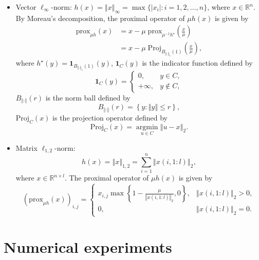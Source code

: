 \documentclass[a4paper]{article}
\newcommand{\norm}[1]{\left\Vert#1\right\Vert}
\newcommand{\mr}{\mathbb{R}}
\newcommand{\prox}{\mathrm{prox}}
\newcommand{\proj}{\mathrm{Proj}}
\newcommand{\mi}{\mathbf{1}}
\begin{document}
\begin{itemize}
  
  \item {Vector $\ell_\infty$-norm:} $h(x) = \norm{x}_\infty = 
  \max\{ |x_i|: i = 1, 2, \ldots, n \}$, where $x \in 
  \mr^n$. By Moreau's decomposition, the proximal operator of $\mu 
  h(x)$ is given by
  \begin{displaymath}
    \begin{split}
      \prox_{\mu h}(x) & = x - \mu \; \prox_{\mu^{-1} h^\star} \left( 
      \frac{x}{\mu} \right) \\
      & = x - \mu \; \proj_{B_{\norm{\cdot}_1}(1)} \left( 
      \frac{x}{\mu} \right),
    \end{split}
  \end{displaymath}
  where $h^\star(y) = \mi_{B_{\norm{\cdot}_1}(1)}(y)$, $\mi_C(y)$ is 
  the indicator function defined by
  \begin{displaymath}
    \mi_C(y) = 
    \begin{cases}
      0, & y \in C, \\
      +\infty, & y \notin C,
    \end{cases}
  \end{displaymath}
  $B_{\norm{\cdot}}(r)$ is the norm ball defined by
  \begin{displaymath}
    B_{\norm{\cdot}}(r) = \left\{ y: \norm{y} \le r \right\},
  \end{displaymath}
  $\proj_C(x)$ is the projection operator defined by
  \begin{displaymath}
    \proj_C(x) = \mathop{\arg\min}\limits_{u \in C} \norm{u - x}_2.
  \end{displaymath}
  
  
  \item {Matrix $\ell_{1,2}$-norm:} $$h(x) = \norm{x}_{1,2} = 
  \sum_{i = 1}^{n} \norm{x(i,1:l)}_2, $$
  where $x \in \mr^{n \times l}$. The proximal operator of $\mu h(x)$ 
  is given by
  \begin{displaymath}
    (\prox_{\mu h}(x))_{i,j} = 
    \begin{cases}
      x_{i,j} \max\left\{ 1 - \frac{\mu}{\norm{x(i,1:l)}_2}, 0 
      \right\}, & \norm{x(i,1:l)}_2 > 0, \\
      0, & \norm{x(i,1:l)}_2 = 0.
    \end{cases}
  \end{displaymath}
  
  
\end{itemize}






\section{Numerical experiments}
\label{sec:num}




%
%


%
  
\end{document}
